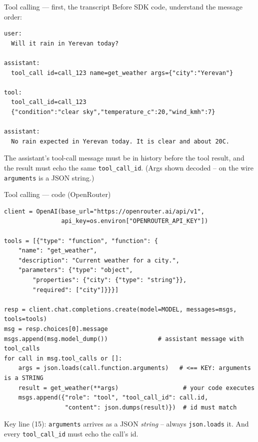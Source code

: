 \documentclass[aspectratio=169,10pt]{beamer}
\begin{document}
\begin{frame}[fragile]{Tool calling --- first, the transcript}
  Before SDK code, understand the \alert{message order}:
\begin{lstlisting}[style=ascii]
user:
  Will it rain in Yerevan today?

assistant:
  tool_call id=call_123 name=get_weather args={"city":"Yerevan"}

tool:
  tool_call_id=call_123
  {"condition":"clear sky","temperature_c":20,"wind_kmh":7}

assistant:
  No rain expected in Yerevan today. It is clear and about 20C.
\end{lstlisting}
  \footnotesize The assistant's tool-call message must be in history \alert{before} the tool result, and the result must echo the same \texttt{tool\_call\_id}. (Args shown decoded -- on the wire \texttt{arguments} is a JSON string.)
\end{frame}
\begin{frame}[fragile]{Tool calling --- code (OpenRouter)}
\begin{lstlisting}
client = OpenAI(base_url="https://openrouter.ai/api/v1",
                api_key=os.environ["OPENROUTER_API_KEY"])

tools = [{"type": "function", "function": {
    "name": "get_weather",
    "description": "Current weather for a city.",
    "parameters": {"type": "object",
        "properties": {"city": {"type": "string"}},
        "required": ["city"]}}}]

resp = client.chat.completions.create(model=MODEL, messages=msgs, tools=tools)
msg = resp.choices[0].message
msgs.append(msg.model_dump())              # assistant message with tool_calls
for call in msg.tool_calls or []:
    args = json.loads(call.function.arguments)   # <== KEY: arguments is a STRING
    result = get_weather(**args)                  # your code executes
    msgs.append({"role": "tool", "tool_call_id": call.id,
                 "content": json.dumps(result)})  # id must match
\end{lstlisting}
\footnotesize \alert{Key line (15):} \texttt{arguments} arrives as a JSON \emph{string} -- always
\texttt{json.loads} it. And every \texttt{tool\_call\_id} must echo the call's id.
\end{frame}
\end{document}
